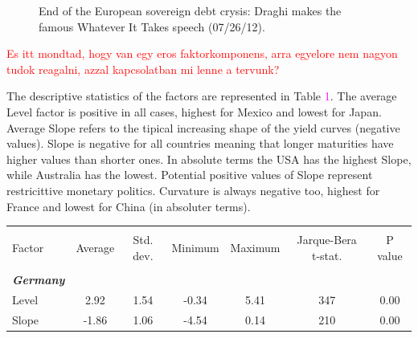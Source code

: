 \documentclass[12pt,bibliography=totoc]{article}
\begin{document}
{\begin{figure}[H]
{End of the European sovereign debt crysis: Draghi makes the famous Whatever It Takes speech (07/26/12).}

\end{figure}


\textcolor{red}{Es itt mondtad, hogy van egy eros faktorkomponens, arra egyelore nem nagyon tudok reagalni, azzal kapcsolatban mi lenne a tervunk?}

The descriptive statistics of the factors are represented in Table \textcolor{magenta}{1}. The average Level factor is positive in all cases, highest for Mexico and lowest for Japan. Average Slope refers to the tipical increasing shape of the yield curves (negative values). Slope is negative for all countries meaning that longer maturities have higher values than shorter ones. In absolute terms the USA has the highest Slope, while Australia has the lowest. Potential positive values of Slope represent restricittive monetary politics. Curvature is always negative too, highest for France and lowest for China (in absoluter terms).


\begin{table}[H]

\fontsize{10}{10}\selectfont
\centering %
\begin{tabular}{l c c c c c c}%
\hline\hline   \\ [-1.5ex]               %
Factor & Average & Std. dev. & Minimum & Maximum & Jarque-Bera t-stat.  & P value \\ [0.5ex] %

\hline       \\ [-1.5ex]           %


\textit{\textbf{Germany}}		&		&		&		&		&		&		\\
Level						&	 2.92 &	1.54	&	-0.34	&	5.41	&	347	&	0.00	\\
Slope				&	-1.86	&	1.06	&	-4.54	&	0.14	&	210	&	0.00	\\
													

\end{tabular}
\end{table}}
\end{document}
